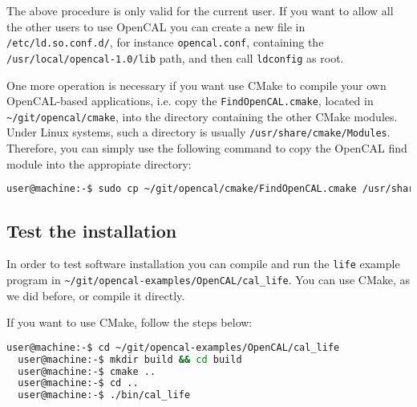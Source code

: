 The above procedure is only valid for the current user. If you want to
allow all the other users to use OpenCAL you can create a new file in
\verb'/etc/ld.so.conf.d/', for instance \verb'opencal.conf',
containing the \verb'/usr/local/opencal-1.0/lib' path, and then call
\verb'ldconfig' as root.

One more operation is necessary if you want use CMake to compile your
own OpenCAL-based applications, i.e. copy the
\verb'FindOpenCAL.cmake', located in \verb'~/git/opencal/cmake', into
the directory containing the other CMake modules. Under Linux systems,
such a directory is usually
\verb'/usr/share/cmake/Modules'. Therefore, you can simply use the
following command to copy the OpenCAL find module into the appropiate
directory:

\begin{lstlisting}[numbers=none,language=bash]
  user@machine:-$ sudo cp ~/git/opencal/cmake/FindOpenCAL.cmake /usr/share/cmake/Modules
\end{lstlisting}


\subsection{Test the installation}\label{sec:installation:test_installation}

In order to test software installation you can compile and run the
\verb'life' example program in
\verb'~/git/opencal-examples/OpenCAL/cal_life'. You can use CMake, as
we did before, or compile it directly.

If you want to use CMake, follow the steps below:

\begin{lstlisting}[numbers=none,language=bash]
  user@machine:-$ cd ~/git/opencal-examples/OpenCAL/cal_life
  user@machine:-$ mkdir build && cd build
  user@machine:-$ cmake ..
  user@machine:-$ cd ..
  user@machine:-$ ./bin/cal_life  
\end{lstlisting}


